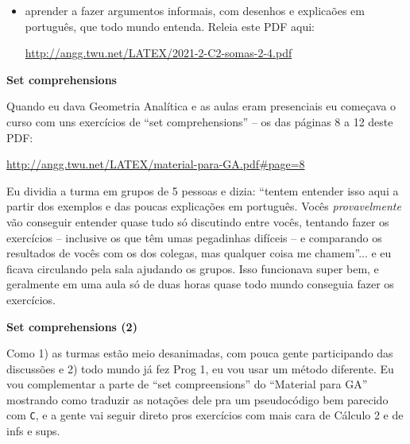 \documentclass[oneside,12pt]{article}
\begin{document}
{{\begin{itemize}
  \item aprender a fazer argumentos informais, com desenhos e explicaões
    em português, que todo mundo entenda. Releia este PDF aqui:

    {\footnotesize

      \url{http://angg.twu.net/LATEX/2021-2-C2-somas-2-4.pdf}

    }

  \end{itemize}


}}


\newpage


{\bf Set comprehensions}

Quando eu dava Geometria Analítica e as aulas eram presenciais eu
começava o curso com uns exercícios de ``set comprehensions'' -- os
das páginas 8 a 12 deste PDF:


\ssk

{\footnotesize

  \url{http://angg.twu.net/LATEX/material-para-GA.pdf\#page=8}

}

\ssk

Eu dividia a turma em grupos de 5 pessoas e dizia: ``tentem entender
isso aqui a partir dos exemplos e das poucas explicações em português.
Vocês {\sl provavelmente} vão conseguir entender quase tudo só
discutindo entre vocês, tentando fazer os exercícios -- inclusive os
que têm umas pegadinhas difíceis -- e comparando os resultados de
vocês com os dos colegas, mas qualquer coisa me chamem''... e eu
ficava circulando pela sala ajudando os grupos. Isso funcionava super
bem, e geralmente em uma aula só de duas horas quase todo mundo
conseguia fazer os exercícios.


\newpage


{\bf Set comprehensions (2)}

Como 1) as turmas estão meio desanimadas, com pouca gente participando
das discussões e 2) todo mundo já fez Prog 1, eu vou usar um método
diferente. Eu vou complementar a parte de ``set compreensions'' do
``Material para GA'' mostrando como traduzir as notações dele pra um
pseudocódigo bem parecido com {\tt C}, e a gente vai seguir direto
pros exercícios com mais cara de Cálculo 2 e de infs e sups.
\end{document}
